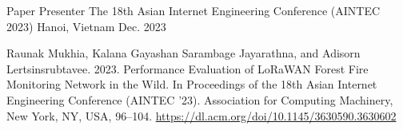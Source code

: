 

\begin{cventries}
	
	\cventry
	{Paper Presenter} %
	{The 18th Asian Internet Engineering Conference (AINTEC 2023)} %
	{Hanoi, Vietnam} %
	{Dec. 2023} %
	{
		\begin{cvitems} %
			\item {Raunak Mukhia, Kalana Gayashan Sarambage Jayarathna, and Adisorn Lertsinsrubtavee. 2023. Performance Evaluation of LoRaWAN Forest Fire Monitoring Network in the Wild. In Proceedings of the 18th Asian Internet Engineering Conference (AINTEC '23). Association for Computing Machinery, New York, NY, USA, 96–104. \url{https://dl.acm.org/doi/10.1145/3630590.3630602}}
		\end{cvitems}
	}
	
\end{cventries}




